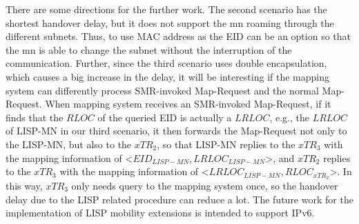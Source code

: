 There are some directions for the further work. The second scenario has the shortest handover delay, but it does not support the \acrshort{mn} roaming through the different subnets. Thus, to use MAC address as the EID can be an option so that the \acrshort{mn} is able to change the subnet without the interruption of the communication. Further, since the third scenario uses double encapsulation, which causes a big increase in the delay, it will be interesting if the mapping system can differently process SMR-invoked Map-Request and the normal Map-Request. When mapping system receives an SMR-invoked Map-Request, if it finds that the $RLOC$ of the queried EID is actually a $LRLOC$, e.g., the $LRLOC$ of LISP-MN in our third scenario, it then forwards the Map-Request not only to the LISP-MN, but also to the $xTR_2$, so that LISP-MN replies to the $xTR_3$ with the mapping information of <$EID_{LISP-MN}, LRLOC_{LISP-MN}$>, and $xTR_2$ replies to the $xTR_3$ with the mapping information of <$LRLOC_{LISP-MN}, RLOC_{xTR_2}$>. In this way, $xTR_3$ only needs query to the mapping system once, so the handover delay due to the LISP related procedure can reduce a lot. The future work for the implementation of LISP mobility extensions is intended to support IPv6. %
